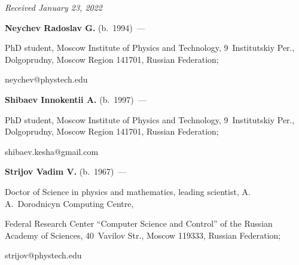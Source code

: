 \vspace*{-6pt}



\hfill{\small\textit{Received January 23, 2022}}



\Contr



\noindent

\textbf{Neychev Radoslav G.} (b.\ 1994)~--- 

PhD student, Moscow Institute of Physics and Technology, 9~Institutskiy Per., Dolgoprudny, Moscow Region 141701, Russian Federation;

\mbox{neychev@phystech.edu}



\vspace*{3pt}



\noindent

\textbf{Shibaev Innokentii A.} (b.\ 1997)~--- 

PhD student, Moscow Institute of Physics and Technology, 9~Institutskiy Per., Dolgoprudny, Moscow Region 141701, Russian Federation; 

\mbox{shibaev.kesha@gmail.com}



\vspace*{3pt}



\noindent

\textbf{Strijov Vadim V.} (b.\ 1967)~--- 

Doctor of Science in physics and mathematics, leading scientist, A.\,A.~Dorodnicyn Computing Centre, 

Federal Research Center ``Computer Science and Control'' of the Russian Academy of Sciences, 40~Vavilov Str., Moscow 119333, Russian Federation;

\mbox{strijov@phystech.edu}





\label{end\stat}



\renewcommand{\bibname}{\protect\rm Литература} 

